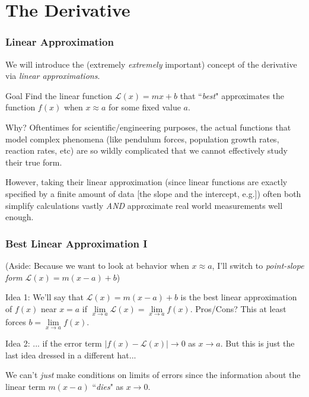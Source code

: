 \documentclass{ltx-talk}
\begin{document}
\section{The Derivative}

\begin{frame}
  \frametitle{Linear Approximation}

  We will introduce the (extremely \textit{extremely} important) concept of 
  the derivative via \textit{linear approximations}. \pause

  \begin{alertblock}{Goal}
    Find the linear function $\mathscr{L}(x) = mx + b$ that 
    ``\textit{best}" approximates the function $f(x)$ \pause 
    when $x \approx a$ for some fixed value $a$. \pause
  \end{alertblock}

  Why? \pause Oftentimes for scientific/engineering purposes,
  the actual functions that model complex phenomena \pause
  (like pendulum forces, population growth rates, reaction rates, etc) \pause
  are so wildly complicated that we cannot effectively study their true form. \pause

  However, taking their linear approximation \pause (since linear functions are exactly specified by a finite amount of data [the slope and the intercept, e.g.]) \pause
  often both simplify calculations vastly \textit{AND} approximate real world measurements well enough.
\end{frame}

\begin{frame}
  \frametitle{Best Linear Approximation I}

  (Aside: \pause Because we want to look at behavior when $x \approx a$,
  I'll switch to \textit{point-slope form} $\mathscr{L}(x) = m(x - a) + b$) \pause

  Idea 1: \pause We'll say that $\mathscr{L}(x) = m(x - a) + b$ is the 
  best linear approximation of $f(x)$ near $x = a$ \pause
  if $\lim\limits_{x \rightarrow a} \mathscr{L}(x) = \lim\limits_{x \rightarrow a} f(x)$. 
  \pause Pros/Cons? 
  \pause This at least forces \pause $b = \lim\limits_{x \rightarrow a} f(x)$.

  Idea 2: \pause ... if the error term $|f(x) - \mathscr{L}(x)| \rightarrow 0$ as $x \rightarrow a$. \pause But this is just the last idea dressed in a different hat... \pause

  We can't \textit{just} make conditions on limits of errors since 
  \pause the information about the linear term $m(x - a)$ ``\textit{dies}" as $x \rightarrow 0$.
\end{frame}
\end{document}
